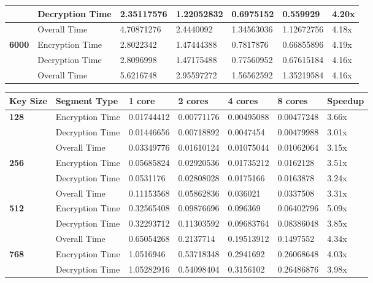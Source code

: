 \documentclass[landscape]{article}
\begin{document}
\begin{landscape}
\begin{tabular}{ | l | l | l | l | l | l | l | }
	 & Decryption Time & 2.35117576 & 1.22052832 & 0.6975152 & 0.559929 & 4.20x \\ \hline
	 & Overall Time & 4.70871276 & 2.4440092 & 1.34563036 & 1.12672756 & 4.18x \\ \hline
	\textbf{6000} & Encryption Time & 2.8022342 & 1.47444388 & 0.7817876 & 0.66855896 & 4.19x \\ \hline
	 & Decryption Time & 2.8096998 & 1.47175488 & 0.77560952 & 0.67615184 & 4.16x \\ \hline
	 & Overall Time & 5.6216748 & 2.95597272 & 1.56562592 & 1.35219584 & 4.16x \\ \hline
\end{tabular}
\end{landscape} 


\begin{landscape}
\begin{tabular}{ | l | l | l | l | l | l | l | }
\hline
	\textbf{Key Size} & \textbf{Segment Type} & \textbf{1 core} & \textbf{2 cores} & \textbf{4 cores} & \textbf{8 cores} & \textbf{Speedup} \\ \hline
	\textbf{128} & Encryption Time & 0.01744412 & 0.00771176 & 0.00495088 & 0.00477248 & 3.66x \\ \hline
	 & Decryption Time & 0.01446656 & 0.00718892 & 0.0047454 & 0.00479988 & 3.01x \\ \hline
	 & Overall Time & 0.03349776 & 0.01610124 & 0.01075044 & 0.01062064 & 3.15x \\ \hline \hline
	\textbf{256} & Encryption Time & 0.05685824 & 0.02920536 & 0.01735212 & 0.0162128 & 3.51x \\ \hline
	 & Decryption Time & 0.0531176 & 0.02808028 & 0.0175166 & 0.0163878 & 3.24x \\ \hline
	 & Overall Time & 0.11153568 & 0.05862836 & 0.036021 & 0.0337508 & 3.31x \\ \hline \hline
	\textbf{512} & Encryption Time & 0.32565408 & 0.09876696 & 0.096369 & 0.06402796 & 5.09x \\ \hline
	 & Decryption Time & 0.32293712 & 0.11303592 & 0.09683764 & 0.08386048 & 3.85x \\ \hline
	 & Overall Time & 0.65054268 & 0.2137714 & 0.19513912 & 0.1497552 & 4.34x \\ \hline \hline
	\textbf{768} & Encryption Time & 1.0516946 & 0.53718348 & 0.2941692 & 0.26068648 & 4.03x \\ \hline
	 & Decryption Time & 1.05282916 & 0.54098404 & 0.3156102 & 0.26486876 & 3.98x \\ \hline

\end{tabular}
\end{landscape}
\end{document}
